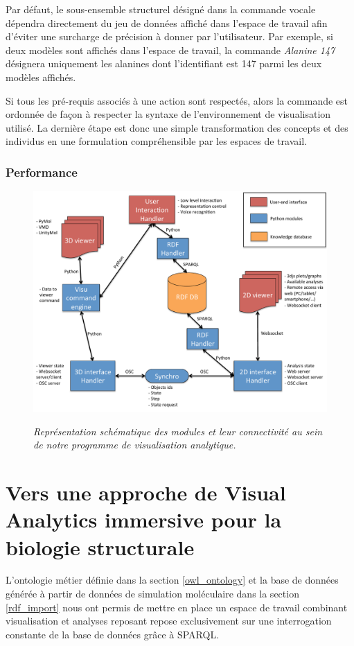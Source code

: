 Par défaut, le sous-ensemble structurel désigné dans la commande vocale dépendra directement du jeu de données affiché dans l'espace de travail afin d'éviter une surcharge de précision à donner par l'utilisateur. Par exemple, si deux modèles sont affichés dans l'espace de travail, la commande \textit{Alanine 147} désignera uniquement les alanines dont l'identifiant est 147 parmi les deux modèles affichés.

Si tous les pré-requis associés à une action sont respectés, alors la commande est ordonnée de façon à respecter la syntaxe de l'environnement de visualisation utilisé. La dernière étape est donc une simple transformation des concepts et des individus en une formulation compréhensible par les espaces de travail.

\subsubsection{Performance}




\begin{figure}
  \centering
  {\includegraphics[width=.75\linewidth]{./figures/ch4/ch4_visu_ana_semantic_schema.pdf}}
    \caption{{\it Représentation schématique des modules et leur connectivité au sein de notre programme de visualisation analytique.}}
  \label{Fig:schema_prog_visu_ana}
  \hspace{0.3cm}
\end{figure}


\section{Vers une approche de Visual Analytics immersive pour la biologie structurale}

L'ontologie métier définie dans la section \ref{owl_ontology} et la base de données générée à partir de données de simulation moléculaire dans la section \ref{rdf_import} nous ont permis de mettre en place un espace de travail combinant visualisation et analyses reposant repose exclusivement sur une interrogation constante de la base de données grâce à SPARQL.

